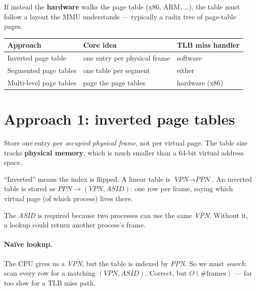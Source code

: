 \documentclass[11pt,a4paper]{article}
\newcommand{\vpn}{\textit{VPN}}
\newcommand{\ppn}{\textit{PPN}}
\begin{document}
If instead the \textbf{hardware} walks the page table (x86, ARM, \ldots),
the table must follow a layout the MMU understands --- typically a
radix tree of page-table pages.

\begin{center}
\renewcommand{\arraystretch}{1.12}
\begin{tabular}{@{}lll@{}}
  \toprule
  \textbf{Approach} & \textbf{Core idea} & \textbf{TLB miss handler} \\
  \midrule
  Inverted page table     & one entry per physical frame & software \\
  Segmented page tables   & one table per segment        & either \\
  Multi-level page tables & page the page tables         & hardware (x86) \\
  \bottomrule
\end{tabular}
\end{center}

\section{Approach 1: inverted page tables}

\begin{defbox}
Store one entry per \emph{occupied physical frame}, not per virtual
page. The table size tracks \textbf{physical memory}, which is much
smaller than a 64-bit virtual address space.
\end{defbox}

``Inverted'' means the index is flipped. A linear table is
\(\vpn \to \ppn\). An inverted table is stored as
\(\ppn \to (\vpn, \textit{ASID})\): one row per frame, saying which
virtual page (of which process) lives there.

The \textit{ASID} is required because two processes can use the same
\vpn. Without it, a lookup could return another process's frame.

\paragraph{Na\"ive lookup.}
The CPU gives us a \vpn, but the table is indexed by \ppn. So we
must \emph{search}: scan every row for a matching
\((\vpn,\textit{ASID})\). Correct, but \(O(\#\text{frames})\) --- far
too slow for a TLB miss path.
\end{document}
